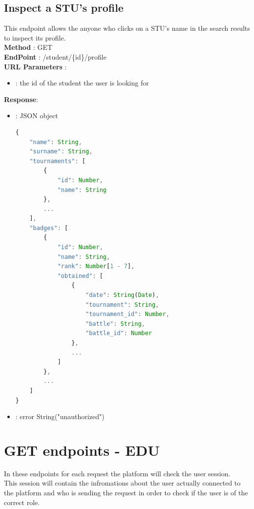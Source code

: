 \subsection*{Inspect a STU's profile}
This endpoint allows the anyone who clicks on a STU's name in the search results to inspect its profile.\\ %
\textbf{Method} : GET \\
\textbf{EndPoint} : /student/\{id\}/profile \\
\textbf{URL Parameters} :
\begin{itemize}
    \item {} : the id of the student the user is looking for
\end{itemize}
\textbf{Response}:
\begin{itemize}
    \item {} : JSON object
          \begin{lstlisting}[language=JavaScript, label={lst:jscode}, basicstyle=\ttfamily]
{
    "name": String,
    "surname": String,  
    "tournaments": [
        {
            "id": Number,
            "name": String
        },
        ...
    ],
    "badges": [
        {
            "id": Number,
            "name": String,
            "rank": Number[1 - 7],
            "obtained": [
                {
                    "date": String(Date),
                    "tournament": String,
                    "tournament_id": Number,
                    "battle": String,
                    "battle_id": Number
                },
                ...
            ]
        },
        ...
    ]
}
        \end{lstlisting}
    \item {} : error String("unauthorized")
\end{itemize}



\section*{GET endpoints - EDU}
In these endpoints for each request the platform will check the user session.\\
This session will contain the infromations about the user actually connected to the platform and who is sending the request in order to check if the user is of the correct role.

